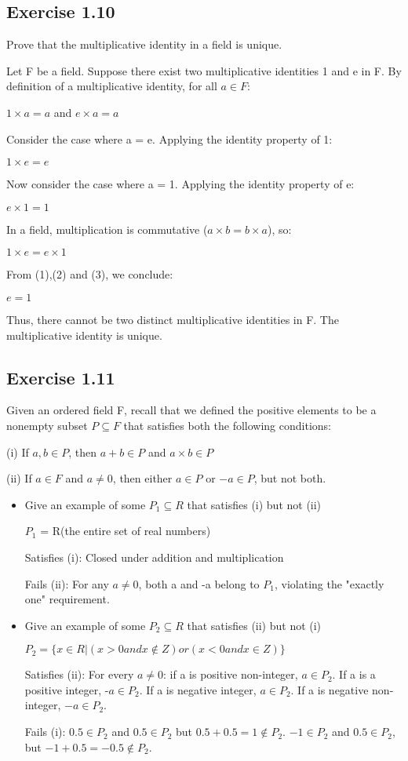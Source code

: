 \documentclass[12pt]{article}
\begin{document}
		\subsection*{Exercise 1.10}
			Prove that the multiplicative identity in a field is unique.
			
			Let F be a field. Suppose there exist two multiplicative identities 1 and e in F. By definition of a multiplicative identity, for all $a \in F$:
			
			$1 \times a = a$ and $e \times a = a$
			
			Consider the case where a = e. Applying the identity property of 1:
			
			$1 \times e = e$
			
			Now consider the case where a = 1. Applying the identity property of e:
			
			$e \times 1 = 1$
			
			In a field, multiplication is commutative ($a \times b = b \times a$), so:
			
			$1 \times e = e \times 1$
			
			From (1),(2) and (3), we conclude:
			
			$e = 1$
			
			Thus, there cannot be two distinct multiplicative identities in F. The multiplicative identity is unique.
		\subsection*{Exercise 1.11}
			Given an ordered field F, recall that we defined the positive elements to be a nonempty subset $P \subseteq F$ that satisfies both the following conditions:
			
			(i) If $a,b \in P$, then $a + b \in P$ and $a \times b \in P$
			
			(ii) If $a \in F$ and $a \ne 0$, then either $a \in P$ or $-a \in P$, but not both.
			
			\begin{itemize}
				\item Give an example of some $P_1 \subseteq R$ that satisfies (i) but not (ii)
				
				$P_1$ = R(the entire set of real numbers)
				
				Satisfies (i): Closed under addition and multiplication
				
				Fails (ii): For any $a \ne 0$, both a and -a belong to $P_1$, violating the "exactly one" requirement.
				
				\item Give an example of some $P_2 \subseteq R$ that satisfies (ii) but not (i)
				
				$P_2 = \{x \in R| (x>0 and x \notin Z) or (x<0 and x \in Z)\}$
				
				Satisfies (ii): For every $a \ne 0$:
				if a is positive non-integer, $a \in P_2$. If a is a positive integer, -$a \in P_2$. If a is negative integer, $a \in P_2$. If a is negative non-integer, $-a \in P_2$.
				
				Fails (i): $0.5 \in P_2$ and $0.5 \in P_2$ but $0.5 + 0.5 = 1 \notin P_2$. $-1 \in P_2$ and $0.5 \in P_2$, but $-1 + 0.5 = -0.5 \notin P_2$.
			\end{itemize}
\end{document}
